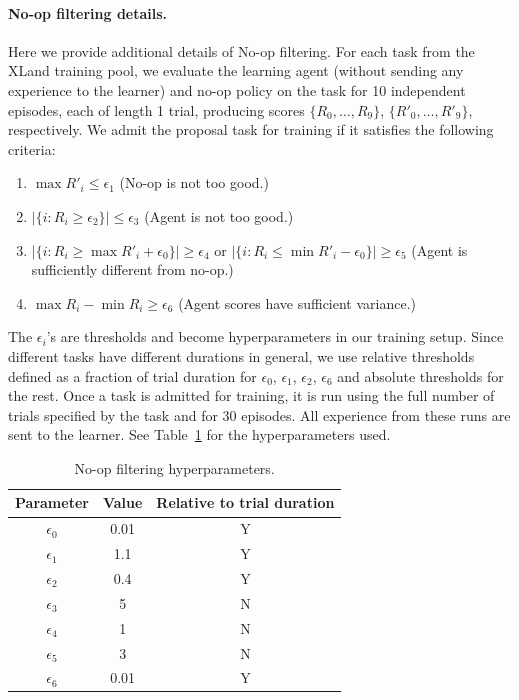 \documentclass[11pt, a4paper, logo, copyright]{deepmind}
\begin{document}
\begin{appendix}
\paragraph{No-op filtering details.} Here we provide additional details of No-op filtering. For each task from the XLand training pool, we evaluate the learning agent (without sending any experience to the learner) and no-op policy on the task for 10 independent episodes, each of length 1 trial,
producing scores $\{R_0, \dots, R_9\}$, $\{R'_0, \dots, R'_9\}$, respectively. We admit the proposal task for training if it satisfies the following criteria:
\begin{enumerate}
    \item $\max R'_i \leq \epsilon_1$ (No-op is not too good.)
    \item $|\{i : R_i \geq \epsilon_2 \}| \leq \epsilon_3$ (Agent is not too good.)
    \item $|\{i : R_i \geq \max R'_i + \epsilon_0 \}| \geq \epsilon_4$ or $|\{i : R_i \leq \min R'_i - \epsilon_0 \}| \geq \epsilon_5$ (Agent is sufficiently different from no-op.)
    \item $\max R_i - \min R_i \geq \epsilon_6$ (Agent scores have sufficient variance.)
\end{enumerate}
The $\epsilon_i$'s are thresholds and become hyperparameters in our training setup. Since different tasks have different durations in general, we use relative thresholds defined as a fraction of trial duration for $\epsilon_0$, $\epsilon_1$, $\epsilon_2$, $\epsilon_6$ and absolute thresholds for the rest. Once a task is admitted for training, it is run using the full number of trials specified by the task and for 30 episodes. All experience from these runs are sent to the learner. See Table~\ref{tab:noop_hyperparameters} for the hyperparameters used.
\begin{table}[h!]
    \centering
    \caption{No-op filtering hyperparameters.}
    \begin{tabular}{c|c|c}
         Parameter & Value & Relative to trial duration \\ \hline
         $\epsilon_0$ & 0.01 & Y \\
         $\epsilon_1$ & 1.1 & Y \\
         $\epsilon_2$ & 0.4 & Y \\
         $\epsilon_3$ & 5 & N \\
         $\epsilon_4$ & 1 & N \\
         $\epsilon_5$ & 3 & N\\
         $\epsilon_6$ & 0.01 & Y
    \end{tabular}
    \label{tab:noop_hyperparameters}
\end{table}

\end{appendix}
\end{document}
